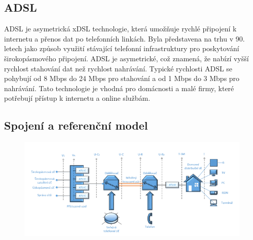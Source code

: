 \subsection{ADSL}
ADSL je asymetrická xDSL technologie, která umožňuje rychlé připojení k internetu a přenos dat po telefonních linkách. Byla představena na trhu v 90. letech jako způsob využití stávající telefonní infrastruktury pro poskytování širokopásmového připojení. ADSL je asymetrické, což znamená, že nabízí vyšší rychlost stahování dat než rychlost nahrávání. Typické rychlosti ADSL se pohybují od 8 Mbps do 24 Mbps pro stahování a od 1 Mbps do 3 Mbps pro nahrávání. Tato technologie je vhodná pro domácnosti a malé firmy, které potřebují přístup k internetu a online službám.



\subsection{Spojení a referenční model}


\begin{figure} [h]
    \centering
    \includegraphics[scale=0.85]{snimky/ADSL model.png}
\end{figure}
\newpage
